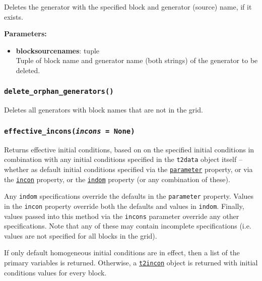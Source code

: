 Deletes the generator with the specified block and generator (source) name, if it exists.

\textbf{Parameters:}
\begin{itemize}
\item \textbf{blocksourcenames}: tuple\\
  Tuple of block name and generator name (both strings) of the generator to be deleted.
\end{itemize}

\begin{snugshade}
\subsubsection{\texttt{delete\_orphan\_generators()}}
\end{snugshade}
\label{sec:t2data:delete_orphan_generators}

Deletes all generators with block names that are not in the grid.

\begin{snugshade}
\subsubsection{\texttt{effective\_incons(\emph{incons} = \texttt{None})}}
\end{snugshade}
\label{sec:t2data:effective_incons}

Returns effective initial conditions, based on on the specified initial conditions in combination
with any initial conditions specified in the \texttt{t2data} object itself -- whether as
default initial conditions specified via the
\hyperref[sec:t2data:parameter]{\texttt{parameter}} property,
or via the \hyperref[sec:t2data:incon]{\texttt{incon}} property, or the
\hyperref[sec:t2data:indom]{\texttt{indom}} property (or any combination of these).

Any \texttt{indom} specifications override the defaults in the \texttt{parameter} property.
Values in the \texttt{incon} property override both the defaults and values in \texttt{indom}.
Finally, values passed into this method via the \texttt{incons} parameter override any other
specifications. Note that any of these may contain incomplete specifications (i.e. values
are not specified for all blocks in the grid).

If only default homogeneous initial conditions are in effect, then a list of the primary variables
is returned. Otherwise, a \hyperref[incons]{\texttt{t2incon}} object is returned with initial
conditions values for every block.

